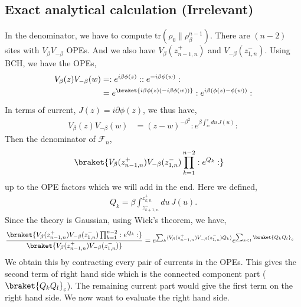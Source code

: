 \documentclass[11pt]{article}
\newcommand{\p}{\partial}
\newcommand{\lb}{\left(}
\newcommand{\rb}{\right)}
\begin{document}
\subsection{Exact analytical calculation (Irrelevant)}
In the denominator, we have to compute $\text{tr}(\rho_0\|\rho_\beta^{n-1})$. There are $(n-2)$ sites with $V_\beta V_{-\beta}$ OPEs. And we also have $V_\beta(z_{n-1,n}^+)$ and $V_{-\beta}(z_{1,n}^-)$. Using BCH, we have the OPEs,
\begin{align}
    V_\beta(z) V_{-\beta}(w) &= :e^{i\beta \phi(z)}: :e^{-i\beta \phi(w)}: \\
    &= e^{\braket{i\beta \phi(z) \lb -i \beta \phi(w)\rb}}: e^{i\beta(\phi(z) - \phi(w))} :
\end{align}
In terms of current, $J(z) = i\p \phi(z)$, we thus have,
\begin{align}\label{eq: non mixing general OPE}
    V_\beta(z) V_{-\beta}(w) &= (z-w)^{-\beta^2} : e^{\beta \int_w^z du\, J(u) } :
\end{align}
Then the denominator of $\mathcal{F}_n$,
\begin{align}
&\braket{V_\beta(z_{n-1,n}^+)V_{-\beta}(z_{1,n}^-) \prod_{k=1}^{n-2} :e^{Q_k}:}
\end{align}
up to the OPE factors which we will add in the end. Here we defined,
\begin{align}
    Q_k = \beta \int_{z_{k+1,n}^-}^{z_{k,n}^+} du \, J(u).
\end{align}
Since the theory is Gaussian, using Wick's theorem, we have,
\begin{align}
    \frac{\braket{V_\beta(z_{n-1,n}^+)V_{-\beta}(z_{1,n}^-) \prod_{k=1}^{n-2} :e^{Q_k}:}}{\braket {V_\beta(z_{n-1,n}^+)V_{-\beta}(z_{1,n}^-) }} 
    &= e^{\sum_k\langle V_\beta(z_{n-1,n}^+)V_{-\beta}(z_{1,n}^-)Q_k \rangle} e^{\sum_{k<l}\braket{Q_kQ_l}_c}
\end{align}
We obtain this by contracting every pair of currents in the OPEs. This gives the second term of right hand side which is the connected component part ($\braket {Q_k Q_l}_c$). The remaining current part would give the first term on the right hand side. We now want to evaluate the right hand side.
\end{document}
